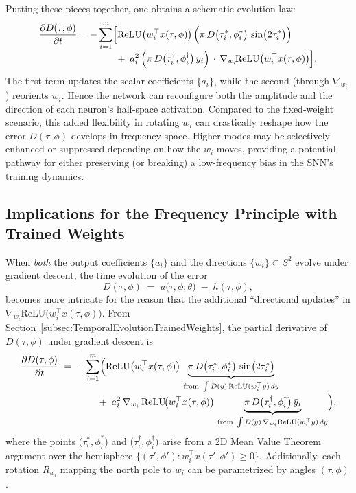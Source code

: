 \documentclass[review,onefignum,onetabnum,onealgnum]{siamart250106}
\numberwithin{theorem}{section}
\begin{document}
Putting these pieces together, one obtains a schematic evolution law:
\[
\begin{aligned}
\frac{\partial D(\tau,\phi)}{\partial t}
&=
-\sum_{i=1}^m
\Bigl[
  \mathrm{ReLU}\bigl(w_i^\top x(\tau,\phi)\bigr)\,
  \Bigl(\pi\,D\bigl(\tau_i^*,\phi_i^*\bigr)\,\sin\bigl(2\tau_i^*\bigr)\Bigr)
\\[-3pt]
&\qquad\qquad
+\;
  a_i^2\,
  \Bigl(\pi\,D\bigl(\tau_i^\dagger,\phi_i^\dagger\bigr)\,\bar{y}_i\Bigr)
  \,\cdot\,
  \nabla_{w_i}\!\mathrm{ReLU}\bigl(w_i^\top x(\tau,\phi)\bigr)
\Bigr].
\end{aligned}
\]
The first term updates the scalar coefficients $\{a_i\}$, while the second (through $\nabla_{w_i}$) reorients $w_i$.  
Hence the network can reconfigure both the amplitude and the direction of each neuron’s half-space activation.  
Compared to the fixed-weight scenario, this added flexibility in rotating $w_i$ can drastically reshape how 
the error $D(\tau,\phi)$ develops in frequency space.  Higher modes may be selectively enhanced or suppressed 
depending on how the $w_i$ moves, providing a potential pathway for either preserving (or breaking) a 
low-frequency bias in the SNN’s training dynamics.



\subsection{Implications for the Frequency Principle with Trained Weights}
\label{Subsec:FPTrainedWeights}

When \emph{both} the output coefficients \(\{a_i\}\) and the directions \(\{w_i\}\subset S^2\) evolve under gradient descent, the time evolution of the error 
\[
D(\tau,\phi)
\;=\;
u\bigl(\tau,\phi;\theta\bigr)\;-\;h(\tau,\phi),
\]
becomes more intricate for the reason that the additional ``directional updates'' in \(\nabla_{w_i}\mathrm{ReLU}\bigl(w_i^\top x(\tau,\phi)\bigr)\).  From Section~\ref{subsec:TemporalEvolutionTrainedWeights}, the partial derivative of \(D(\tau,\phi)\) under gradient descent is
\[
\begin{aligned}
\frac{\partial D(\tau,\phi)}{\partial t}
&\;=\;
-\sum_{i=1}^{m}
\Bigl(
  \mathrm{ReLU}\bigl(w_i^\top x(\tau,\phi)\bigr)\,\underbrace{\pi\,D\bigl(\tau_i^*,\phi_i^*\bigr)\,\sin\bigl(2\tau_i^*\bigr)}_{\text{from } \int D(y)\,\mathrm{ReLU}(w_i^\top y)\,dy}
\\[-3pt]
&\qquad\qquad
+\;a_i^2\,\nabla_{w_i}\,\mathrm{ReLU}\!\bigl(w_i^\top x(\tau,\phi)\bigr)\,
\underbrace{\pi\,D\bigl(\tau_i^\dagger,\phi_i^\dagger\bigr)\,\bar{y}_i}_{\text{from } \int D(y)\,\nabla_{w_i}\mathrm{ReLU}(w_i^\top y)\,dy}
\Bigr),
\end{aligned}
\]
where the points \(\bigl(\tau_i^*,\phi_i^*\bigr)\) and \(\bigl(\tau_i^\dagger,\phi_i^\dagger\bigr)\) arise from a 2D Mean Value Theorem argument over the hemisphere \(\{(\tau',\phi'): w_i^\top x(\tau',\phi')\ge0\}\).  Additionally, each rotation \(R_{w_i}\) mapping the north pole to \(w_i\) can be parametrized by angles \((\tau,\phi)\).  
\end{document}
